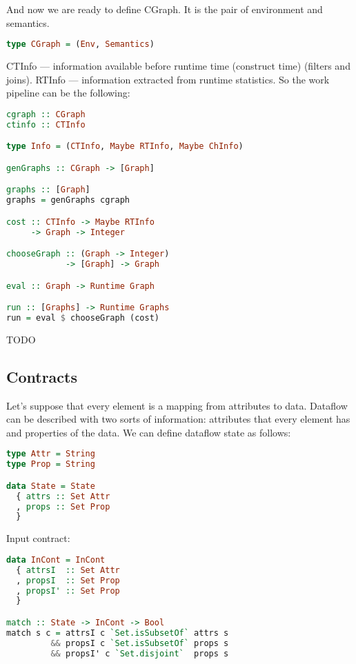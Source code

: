 And now we are ready to define CGraph.
It is the pair of environment and semantics.

\begin{lstlisting}[language=Haskell]
type CGraph = (Env, Semantics)
\end{lstlisting}

CTInfo --- information available before runtime time (construct time) (filters and joins).
RTInfo --- information extracted from runtime statistics.
So the work pipeline can be the following:

\begin{lstlisting}[language=Haskell]
cgraph :: CGraph
ctinfo :: CTInfo

type Info = (CTInfo, Maybe RTInfo, Maybe ChInfo)

genGraphs :: CGraph -> [Graph]

graphs :: [Graph]
graphs = genGraphs cgraph

cost :: CTInfo -> Maybe RTInfo
     -> Graph -> Integer

chooseGraph :: (Graph -> Integer)
            -> [Graph] -> Graph

eval :: Graph -> Runtime Graph

run :: [Graphs] -> Runtime Graphs
run = eval $ chooseGraph (cost)

\end{lstlisting}
TODO

\subsection{Contracts}

Let's suppose that every element is a mapping from attributes to data.
Dataflow can be described with two sorts of information: attributes that every element has and properties of the data.
We can define dataflow state as follows:

\begin{lstlisting}[language=Haskell]
type Attr = String
type Prop = String

data State = State
  { attrs :: Set Attr
  , props :: Set Prop
  }
\end{lstlisting}

Input contract:

\begin{lstlisting}[language=Haskell]
data InCont = InCont
  { attrsI  :: Set Attr
  , propsI  :: Set Prop
  , propsI' :: Set Prop
  }

match :: State -> InCont -> Bool
match s c = attrsI c `Set.isSubsetOf` attrs s
         && propsI c `Set.isSubsetOf` props s
         && propsI' c `Set.disjoint`  props s
\end{lstlisting}

